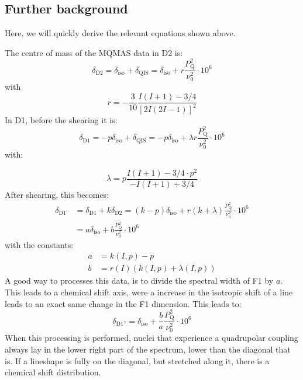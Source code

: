 \documentclass[11pt,a4paper]{article}
\begin{document}
 \subsection{Further background}
 Here, we will quickly derive the relevant equations shown above.

 The centre of mass of the MQMAS data in D2 is:
 \begin{equation}
	\delta_\text{D2} = \delta_\text{iso} + \delta_\text{QIS}  =  \delta_\text{iso} + r
	\frac{P_\text{Q}^2}{\nu_0^2} \cdot 10^6
 \end{equation}
 with
 \begin{equation}
	r = -\frac{3}{10}\frac{I(I+1)-3/4}{[2I(2I-1)]^2}
 \end{equation}
 In D1, before the shearing it is:
 \begin{equation}
	\delta_\text{D1} = -p\delta_\text{iso} + \delta_\text{QIS}  =  -p\delta_\text{iso} +
	\lambda r
	\frac{P_\text{Q}^2}{\nu_0^2} \cdot 10^6
 \end{equation}
 with:

 \begin{equation}
	\lambda = p \frac{I(I+1)-3/4 \cdot p^2}{-I(I+1)+3/4}
 \end{equation}
After shearing, this becomes:
 \begin{align}
	\delta_\text{D1'} &= \delta_\text{D1} + k\delta_\text{D2} = (k - p)\delta_\text{iso} +
	r	(k + \lambda) \frac{P_\text{Q}^2}{\nu_0^2} \cdot 10^6 \\
	& = a  \delta_\text{iso} + b \frac{P_\text{Q}^2}{\nu_0^2} \cdot 10^6
 \end{align}
 with the constants:
 \begin{align}
	a & = k(I,p) - p \\
	b & = r(I)	(k(I,p) + \lambda(I,p))
 \end{align}
 A good way to processes this data, is to divide the spectral width of F1 by $a$. This leads to a
 chemical shift axis, were a increase in the isotropic shift of a line leads to an exact same change
 in the F1 dimension. This leads to:
 \begin{equation}
	\delta_\text{D1''} = \delta_\text{iso} + \frac{b}{a} \frac{P_\text{Q}^2}{\nu_0^2} \cdot 10^6
 \end{equation}
 When this processing is performed, nuclei that experience a quadrupolar coupling always lay in the
 lower right part of the spectrum, lower than the diagonal that is. If a lineshape is fully on the
 diagonal, but stretched along it, there is a chemical shift distribution.
\end{document}
